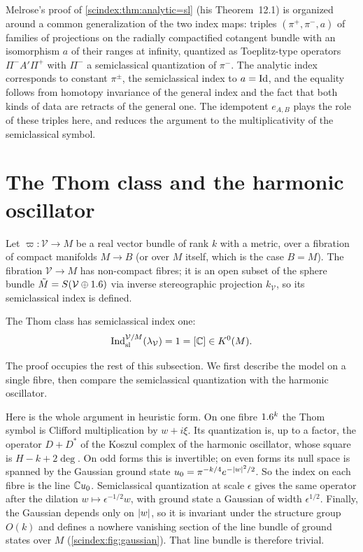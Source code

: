 \begin{remark}\label{scindex:rem:compare-melrose-12.1}
  Melrose's proof of \cref{scindex:thm:analytic=sl} (his Theorem~12.1) is
  organized around a common generalization of the two index maps: triples
  $(\pi^+,\pi^-,a)$ of families of projections on the radially compactified
  cotangent bundle with an isomorphism $a$ of their ranges at infinity, quantized
  as Toeplitz-type operators $\Pi^-A'\Pi^+$ with $\Pi^-$ a semiclassical
  quantization of $\pi^-$. The analytic index corresponds to constant $\pi^\pm$,
  the semiclassical index to $a=\operatorname{Id}$, and the equality follows from homotopy
  invariance of the general index and the fact that both kinds of data are
  retracts of the general one. The idempotent $e_{A,B}$ plays the role of these
  triples here, and reduces the argument to the multiplicativity of the
  semiclassical symbol.
\end{remark}

\section{The Thom class and the harmonic oscillator}\label{scindex:sec:thom}

Let $\varpi:\mathcal V\to M$ be a real vector bundle of rank $k$ with a metric,
over a fibration of compact manifolds $M\to B$ (or over $M$ itself, which is the
case $B=M$). The fibration $\mathcal V\to M$ has non-compact fibres; it is an
open subset of the sphere bundle $\tilde M=S(\mathcal V\oplus1.6)$ via inverse
stereographic projection $k_{\mathcal V}$, so its semiclassical index is defined.

\begin{theorem}\label{scindex:thm:thom}
  The Thom class has semiclassical index one:
  \begin{equation*}
    \operatorname{Ind}^{\mathcal V/M}_{\mathrm{sl}}(\lambda_{\mathcal V})=1=[\mathbb{C}]\in K^0(M).
  \end{equation*}
\end{theorem}

The proof occupies the rest of this subsection. We first describe the model on a
single fibre, then compare the semiclassical quantization with the harmonic
oscillator.

\begin{discussion}
  Here is the whole argument in heuristic form. On one fibre $1.6^k$ the Thom
  symbol is Clifford multiplication by $w+i\xi$. Its quantization is, up to a
  factor, the operator $D+D^*$ of the Koszul complex of the harmonic oscillator,
  whose square is $H-k+2\deg$. On odd forms this is invertible; on even forms its
  null space is spanned by the Gaussian ground state $u_0=\pi^{-k/4}e^{-\lvert w\rvert^2/2}$. So the index on each fibre is the line $\mathbb{C} u_0$. Semiclassical
  quantization at scale $\epsilon$ gives the same operator after the dilation
  $w\mapsto\epsilon^{-1/2}w$, with ground state a Gaussian of width
  $\epsilon^{1/2}$. Finally, the Gaussian depends only on $\lvert w\rvert$, so it is
  invariant under the structure group $O(k)$ and defines a nowhere vanishing
  section of the line bundle of ground states over $M$
  (\cref{scindex:fig:gaussian}). That line bundle is therefore trivial.
\end{discussion}

